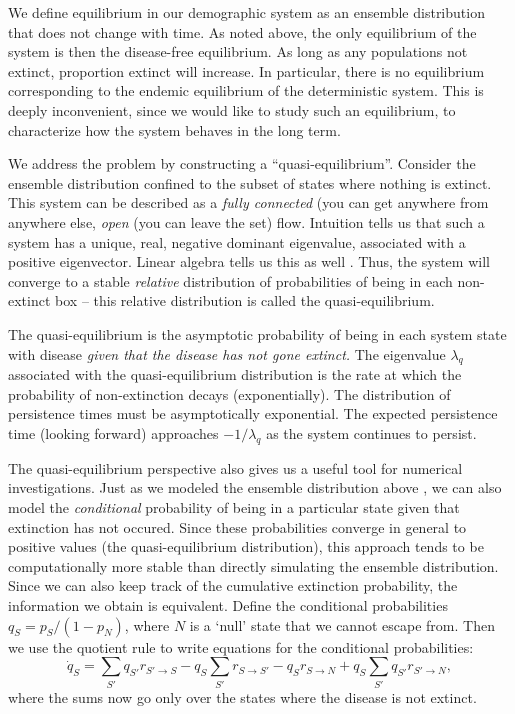 \documentclass{amsproc}
\theoremstyle{definition}
\theoremstyle{remark}
\numberwithin{equation}{section}
\begin{document}
We define equilibrium in our demographic system as an ensemble distribution that does not change with time. 
As noted above, the only equilibrium of the system is then the disease-free equilibrium. 
As long as any populations not extinct, proportion extinct will increase.
In particular, there is no equilibrium corresponding to the endemic equilibrium of the deterministic system. 
This is deeply inconvenient, since we would like to study such an equilibrium, to characterize how the system behaves in the long term.

We address the problem by constructing a ``quasi-equilibrium''. 
Consider the ensemble distribution confined to the subset of states where nothing is extinct. 
This system can be described as a {\em fully connected} (you can get anywhere from anywhere else, {\em open} (you can leave the set) flow. 
Intuition tells us that such a system has a unique, real, negative dominant eigenvalue, associated with a positive eigenvector. 
Linear algebra tells us this as well .  Thus, the system will converge to a stable {\em relative} distribution of probabilities of being in each non-extinct box -- this relative distribution is called the quasi-equilibrium.

The quasi-equilibrium is the asymptotic probability of being in each system state with disease {\em given that the disease has not gone extinct.} 
The eigenvalue $\lambda_q$ associated with the quasi-equilibrium distribution is the rate at which the probability of non-extinction decays (exponentially). 
The distribution of persistence times must be asymptotically exponential. 
The expected persistence time (looking forward) approaches $-1/\lambda_q$ as the system continues to persist.

The quasi-equilibrium perspective also gives us a useful tool for numerical investigations.  
Just as we modeled the ensemble distribution above ,  we can also model the {\em conditional} probability of being in a particular state given that extinction has not occured. 
Since these probabilities converge in general to positive values (the quasi-equilibrium distribution), this approach tends to be computationally more stable than directly simulating the ensemble distribution. 
Since we can also keep track of the cumulative extinction probability, the information we obtain is equivalent. 
Define the conditional probabilities $q_S = p_S/(1-p_N)$, where $N$ is a `null' state that we cannot escape from.  Then we use the quotient rule to write equations for the conditional probabilities:
\begin{equation}
	\dot q_S = \sum_{S'}{q_{S'} r_{S'\to S}}
	-  q_S \sum_{S'}{r_{S\to S'}}  
	- q_S r_{S\to N}
	+ q_S \sum_{S'} q_{S'} r_{S'\to N},
\end{equation}
where the sums now go only over the states where the disease is not extinct.
\end{document}
